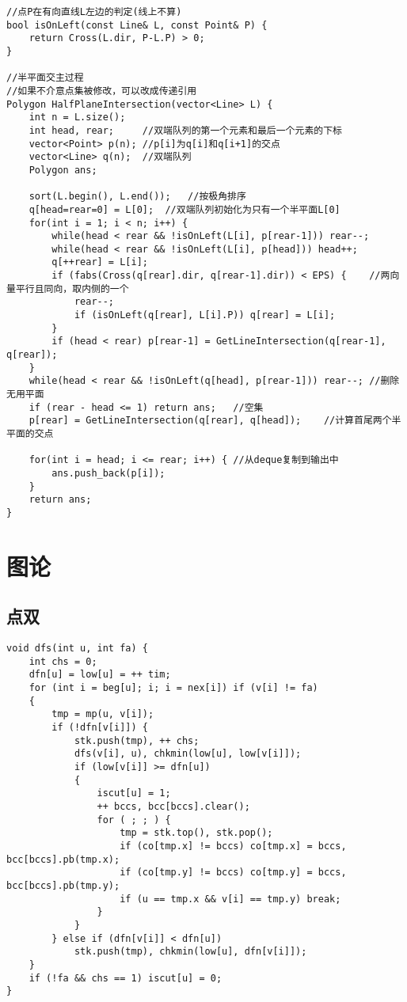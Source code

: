 \documentclass[twocolumn,a4]{article}
\begin{document}
\begin{lstlisting}
//点P在有向直线L左边的判定(线上不算)
bool isOnLeft(const Line& L, const Point& P) {
    return Cross(L.dir, P-L.P) > 0;
}
 
//半平面交主过程
//如果不介意点集被修改，可以改成传递引用
Polygon HalfPlaneIntersection(vector<Line> L) {
    int n = L.size();
    int head, rear;     //双端队列的第一个元素和最后一个元素的下标
    vector<Point> p(n); //p[i]为q[i]和q[i+1]的交点
    vector<Line> q(n);  //双端队列
    Polygon ans;
 
    sort(L.begin(), L.end());   //按极角排序
    q[head=rear=0] = L[0];  //双端队列初始化为只有一个半平面L[0]
    for(int i = 1; i < n; i++) {
        while(head < rear && !isOnLeft(L[i], p[rear-1])) rear--;
        while(head < rear && !isOnLeft(L[i], p[head])) head++;
        q[++rear] = L[i];
        if (fabs(Cross(q[rear].dir, q[rear-1].dir)) < EPS) {    //两向量平行且同向，取内侧的一个
            rear--;
            if (isOnLeft(q[rear], L[i].P)) q[rear] = L[i];
        }
        if (head < rear) p[rear-1] = GetLineIntersection(q[rear-1], q[rear]);
    }
    while(head < rear && !isOnLeft(q[head], p[rear-1])) rear--; //删除无用平面
    if (rear - head <= 1) return ans;   //空集
    p[rear] = GetLineIntersection(q[rear], q[head]);    //计算首尾两个半平面的交点
 
    for(int i = head; i <= rear; i++) { //从deque复制到输出中
        ans.push_back(p[i]);
    }
    return ans;
}
\end{lstlisting}

\section{图论}
\subsection{点双}
\begin{lstlisting}
void dfs(int u, int fa) {
	int chs = 0;
	dfn[u] = low[u] = ++ tim;
	for (int i = beg[u]; i; i = nex[i]) if (v[i] != fa)
	{
		tmp = mp(u, v[i]);
		if (!dfn[v[i]]) {
			stk.push(tmp), ++ chs;
			dfs(v[i], u), chkmin(low[u], low[v[i]]);
			if (low[v[i]] >= dfn[u])
			{
				iscut[u] = 1;
				++ bccs, bcc[bccs].clear();
				for ( ; ; ) {
					tmp = stk.top(), stk.pop();
					if (co[tmp.x] != bccs) co[tmp.x] = bccs, bcc[bccs].pb(tmp.x);
					if (co[tmp.y] != bccs) co[tmp.y] = bccs, bcc[bccs].pb(tmp.y);
					if (u == tmp.x && v[i] == tmp.y) break;
				}
			}
		} else if (dfn[v[i]] < dfn[u])
			stk.push(tmp), chkmin(low[u], dfn[v[i]]);
	}
	if (!fa && chs == 1) iscut[u] = 0;
}
\end{lstlisting}
\end{document}
